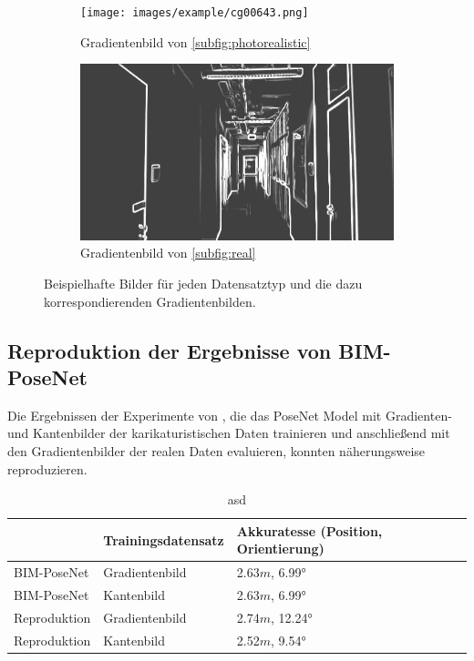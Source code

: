 \begin{figure}[htp]
	\begin{subfigure}[t]{0.24\linewidth}
		\centering
		\texttt{[image: images/example/cg00643.png]}
		\caption{Gradientenbild  \hspace{1cm} von \ref{subfig:photorealistic}}
	\end{subfigure}
	\begin{subfigure}[t]{0.24\linewidth}
		\centering
		\includegraphics[width=\linewidth]{images/example/rg000305.png}
		\caption{Gradientenbild  \hspace{1cm} von \ref{subfig:real}}
	\end{subfigure}
	\hfill
	\caption{Beispielhafte Bilder für jeden Datensatztyp und die dazu korrespondierenden Gradientenbilden.}
	\label{fig:dataset_preprocess}
\end{figure}
\vspace{\fill}

\subsection{Reproduktion der Ergebnisse von BIM-PoseNet}
Die Ergebnissen der Experimente von \citet{acharyaBIMPoseNetIndoorCamera2019}, die das PoseNet Model mit Gradienten- und Kantenbilder der karikaturistischen Daten trainieren und anschließend mit den Gradientenbilder der realen Daten evaluieren, konnten näherungsweise reproduzieren. 


\begin{table}[H]
	\centering
	\caption{asd}
	\begin{tabularx}{1.0\textwidth}{X X X}
		 & \textbf{Trainingsdatensatz} & \textbf{Akkuratesse} \hspace{2cm} (Position, Orientierung)\\
		\hline
		BIM-PoseNet & Gradientenbild & 2.63$m$, 6.99°\\
		\hline
		BIM-PoseNet & Kantenbild & 2.63$m$, 6.99°\\
		\hline
		Reproduktion & Gradientenbild & 2.74$m$, 12.24°\\
		\hline
		Reproduktion & Kantenbild & 2.52$m$, 9.54°\\
		\hline
	\end{tabularx}
	\label{tab:reproduction}
\end{table}




